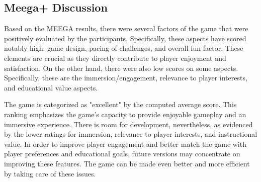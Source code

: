 \subsection{Meega+ Discussion}
Based on the MEEGA results, there were several factors of the game that were positively evaluated by the participants. Specifically, these aspects have scored notably high: game design, pacing of challenges, and overall fun factor. These elements are crucial as they directly contribute to player enjoyment and satisfaction. On the other hand, there were also low scores on some aspects. Specifically, these are the immersion/engagement, relevance to player interests, and educational value aspects.

The game is categorized as "excellent" by the computed average score. This ranking emphasizes the game's capacity to provide enjoyable gameplay and an immersive experience. There is room for development, nevertheless, as evidenced by the lower ratings for immersion, relevance to player interests, and instructional value. In order to improve player engagement and better match the game with player preferences and educational goals, future versions may concentrate on improving these features. The game can be made even better and more efficient by taking care of these issues.



